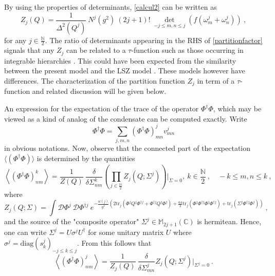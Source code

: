 \documentclass[a4paper,11pt,twoside]{article}
\numberwithin{equation}{section}
\theoremstyle{nonumberplain}
\newcounter{and}
\begin{document}
%
By using the properties of determinants, \eqref{calcul2} can be written as%
%
\begin{equation}
Z_j(Q) = \frac{1}{\Delta^2(Q^j)} \ N^j(g^2) \ (2j+1)! \ \det_{-j\le m,n\le j} \left(f(\omega^j_m+\omega^j_n)\right) \ , \label{partitionfactor}
\end{equation}
%
for any $j\in\frac{\mathbb{N}}{2}$. The ratio of determinants appearing in the RHS of \eqref{partitionfactor} signals that any $Z_j$ can be related to a $\tau$-function such as those occurring in integrable hierarchies \cite{integ1-rev}. This could have been expected from the similarity between the present model and the LSZ model \cite{LSZ}. These models however have differences. The characterization of the partition function $Z_j$ in term of a $\tau$-function and related discussion will be given below.\par%
%
An expression for the expectation of the trace of the operator $\Phi^\dag\Phi$, which may be viewed as a kind of analog of the condensate can be computed exactly. Write
\begin{equation*}
\Phi^\dag\Phi = \sum_{j,m,n}(\Phi^\dag\Phi)^j_{mn}v^j_{mn}
\end{equation*}
in obvious notations. Now, observe that the connected part of the expectation $\langle(\Phi^\dag\Phi) \rangle$ is determined by the quantities%
%
\begin{equation}
\left\langle(\Phi^\dag\Phi)^k_{nm}\right\rangle = \frac{1}{Z(Q)} \ \frac{\delta}{\delta\Sigma^k_{nm}} \left(\prod_{j\in\frac{\mathbb{N}}{2}}Z_j(Q;\Sigma^j)\right)\Bigg|_{\Sigma=0 },\ k\in\frac{\mathbb{N}}{2} \ , \quad -k\le m,n\le k \ ,
\end{equation}
%
where%
%
\begin{equation}
Z_j(Q;\Sigma) = \int{\mathcal{D}} \Phi^j \ \mathcal{D} \Phi^{\dag j} \ e^{-\frac{w(j)}{g^2} \left(2\mbox{tr}_j\left(\Phi^j Q^j\Phi^{\dag j}+\Phi^{\dag j} Q^j\Phi^j\right)+\frac{64}{3}\mbox{tr}_j\left(\Phi^j\Phi^{\dag j}\Phi^j\Phi^{\dag j}\right)+\mbox{tr}_j\left(\Sigma^j\Phi^{\dag j}\Phi^j\right) \right)} \ , \label{condensat-generating}
\end{equation}
%
and the source of the "composite operator" $\Sigma^j\in\mathbb{M}_{2j+1}(\mathbb{C})$ is hermitean. Hence, one can write $\Sigma^j=U\sigma^jU^\dag$ for some unitary matrix $U$ where $\sigma^j=\text{diag}(s^j_k)_{-j\le k\le j}$. From this follows that
%
\begin{equation}
\left\langle (\Phi^\dag\Phi)^j_{nm} \right\rangle = \frac{1}{Z_j(Q)} \ \frac{\delta}{\delta\Sigma^j_{mn}} Z_j(Q;\Sigma^j)\bigg|_{\Sigma^j=0} \ . \label{condensat-component}
\end{equation}
\end{document}
